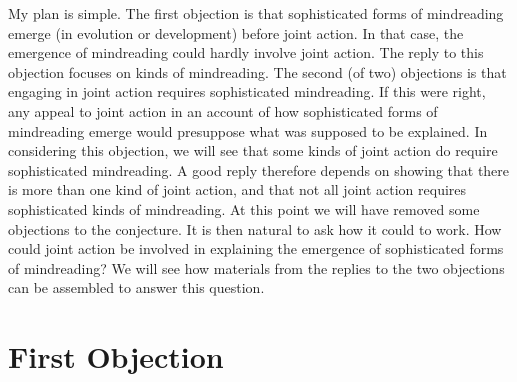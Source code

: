 \documentclass[12pt,\papersize]{extarticle}
\begin{document}
My plan is simple. 
The first objection is that sophisticated forms of mindreading emerge (in evolution or development) before joint action. 
In that case, the emergence of mindreading could hardly involve joint action. 
The reply to this objection focuses on kinds of mindreading.  The second (of two) objections is that engaging in joint action requires sophisticated mindreading.
If this were right, any appeal to joint action in an account of how sophisticated forms of mindreading emerge  would presuppose what was supposed to be explained.   
In considering this objection, we will see that some kinds of joint action do require sophisticated mindreading. 
A good reply therefore depends on showing that there is more than one kind of joint action, and that not all joint action requires sophisticated kinds of mindreading.
At this point we will have removed some objections to the conjecture.
It is then natural to ask how it could to work.
How could joint action be involved in explaining the emergence of sophisticated forms of mindreading?
We will see how materials from the replies to the two objections can be assembled to answer this question.



\section{First Objection}






\end{document}
